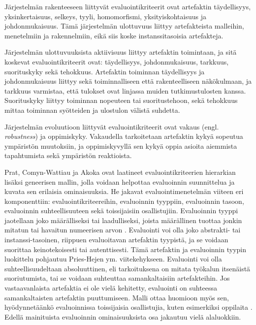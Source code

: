 \documentclass[utf8]{gradu3}
\begin{document}
Järjestelmän rakenteeseen liittyvät evaluointikriteerit ovat artefaktin täydellisyys, yksinkertaisuus, selkeys, tyyli, homomorfismi, yksityiskohtaisuus ja johdonmukaisuus. Tämä järjestelmän ulottuvuus liittyy artefakteista malleihin, menetelmiin ja rakennelmiin, eikä siis koske instanssitasoisia artefakteja. \parencite{evaluation}

Järjestelmän ulottuvuuksista aktiivisuus liittyy artefaktin toimintaan, ja sitä koskevat evaluointikriteerit ovat: täydellisyys,  johdonmukaisuus, tarkkuus, suorituskyky sekä tehokkuus. Artefaktin toiminnan täydellisyys ja johdonmukaisuus liittyy sekä toiminnalliseen että rakenteelliseen näkökulmaan, ja tarkkuus varmistaa, että tulokset ovat linjassa muiden tutkimustulosten kanssa. Suorituskyky liittyy toiminnan nopeuteen tai suoritustehoon, sekä tehokkuus mittaa toiminnan syötteiden ja ulostulon välistä suhdetta. \parencite{evaluation}

Järjestelmän evoluutioon liittyvät evaluointikriteerit ovat vakaus (engl. \textit{robustness}) ja oppimiskyky. Vakaudella tarkoitetaan artefaktin kykyä sopeutua ympäristön muutoksiin, ja oppimiskyvyllä sen kykyä oppia asioita aiemmista tapahtumista sekä ympäristön reaktioista. \parencite{evaluation}

Prat, Comyn-Wattiau ja Akoka \parencite*{evaluation} ovat laatineet evaluointikriteerien hierarkian lisäksi geneerisen mallin, jolla voidaan helpottaa evaluoinnin suunnittelua ja kuvata sen erilaisia ominaisuuksia. He jakavat evaluointimenetelmän viiteen eri komponenttiin: evaluointikriteereihin, evaluoinnin tyyppiin, evaluoinnin tasoon, evaluoinnin suhteellisuuteen sekä toissijaisiin osallistujiin. Evaluoinnin tyyppi jaotellaan joko määrälliseksi tai laadulliseksi, joista määrällinen tuottaa jonkin mitatun tai havaitun numeerisen arvon \parencite{evaluation}. Evaluointi voi olla joko abstrakti- tai instanssi-tasoinen, riippuen evaluoitavan artefaktin tyypistä, ja se voidaan suorittaa keinotekoisesti tai autenttisesti. Tämä artefaktin ja evaluoinnin tyypin luokittelu pohjautuu Pries-Hejen ym. \parencite*{pries} viitekehykseen. Evaluointi voi olla suhteellisuudeltaan absoluuttinen, eli tarkoituksena on mitata työkalun itsenäistä suoriutumista, tai se voidaan suhteuttaa samankaltaisiin artefakteihin. Jos vastaavanlaista artefaktia ei ole vielä kehitetty, evaluointi on suhteessa samankaltaisten artefaktin puuttumiseen. Malli ottaa huomioon myös sen, hyödynnetäänkö evaluoinnissa toissijaisia osallistujia, kuten esimerkiksi oppilaita \parencite{evaluation}. Edellä mainituista evaluoinnin ominaisuuksista osa jakautuu vielä alaluokkiin.
\end{document}
